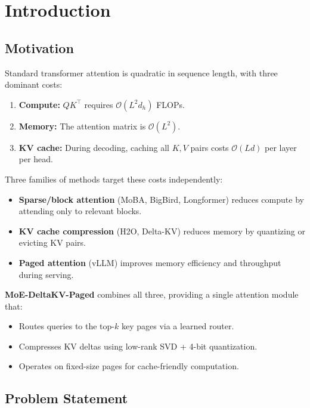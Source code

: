 \section{Introduction}

\subsection{Motivation}

Standard transformer attention is quadratic in sequence length, with three 
dominant costs:

\begin{enumerate}
\item \textbf{Compute:} $QK^\top$ requires $\mathcal{O}(L^2 d_h)$ FLOPs.
\item \textbf{Memory:} The attention matrix is $\mathcal{O}(L^2)$.
\item \textbf{KV cache:} During decoding, caching all $K, V$ pairs costs
  $\mathcal{O}(L d)$ per layer per head.

\end{enumerate}
Three families of methods target these costs independently:

\begin{itemize}
\item \textbf{Sparse/block attention} (MoBA, BigBird, Longformer) reduces compute
  by attending only to relevant blocks.
\item \textbf{KV cache compression} (H2O, Delta-KV) reduces memory by quantizing or
  evicting KV pairs.
\item \textbf{Paged attention} (vLLM) improves memory efficiency and throughput
  during serving.

\end{itemize}
\textbf{MoE-DeltaKV-Paged} combines all three, providing a single attention module 
that:
\begin{itemize}
\item Routes queries to the top-$k$ key pages via a learned router.
\item Compresses KV deltas using low-rank SVD + 4-bit quantization.
\item Operates on fixed-size pages for cache-friendly computation.

\end{itemize}
\subsection{Problem Statement}

